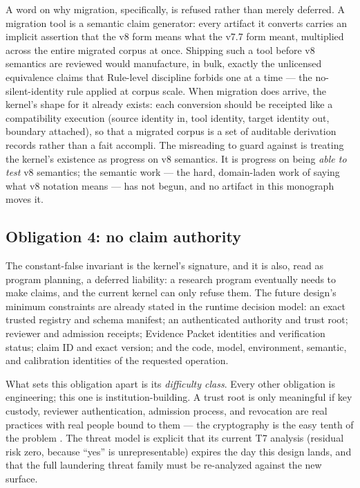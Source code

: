 A word on why migration, specifically, is refused rather than merely deferred. A migration tool is a semantic claim generator: every artifact it converts carries an implicit assertion that the v8 form means what the v7.7 form meant, multiplied across the entire migrated corpus at once. Shipping such a tool before v8 semantics are reviewed would manufacture, in bulk, exactly the unlicensed equivalence claims that Rule-level discipline forbids one at a time --- the no-silent-identity rule applied at corpus scale. When migration does arrive, the kernel's shape for it already exists: each conversion should be receipted like a compatibility execution (source identity in, tool identity, target identity out, boundary attached), so that a migrated corpus is a set of auditable derivation records \cite{prov} rather than a fait accompli. The misreading to guard against is treating the kernel's existence as progress on v8 semantics. It is progress on being \emph{able to test} v8 semantics; the semantic work --- the hard, domain-laden work of saying what v8 notation means --- has not begun, and no artifact in this monograph moves it.

\subsection{Obligation 4: no claim authority}\label{evid:ob:authority}

The constant-false invariant is the kernel's signature, and it is also, read as program planning, a deferred liability: a research program eventually needs to make claims, and the current kernel can only refuse them. The future design's minimum constraints are already stated in the runtime decision model: an exact trusted registry and schema manifest; an authenticated authority and trust root; reviewer and admission receipts; Evidence Packet identities and verification status; claim ID and exact version; and the code, model, environment, semantic, and calibration identities of the requested operation.

What sets this obligation apart is its \emph{difficulty class}. Every other obligation is engineering; this one is institution-building. A trust root is only meaningful if key custody, reviewer authentication, admission process, and revocation are real practices with real people bound to them --- the cryptography is the easy tenth of the problem \cite{anderson}. The threat model is explicit that its current T7 analysis (residual risk zero, because ``yes'' is unrepresentable) expires the day this design lands, and that the full laundering threat family must be re-analyzed against the new surface.


